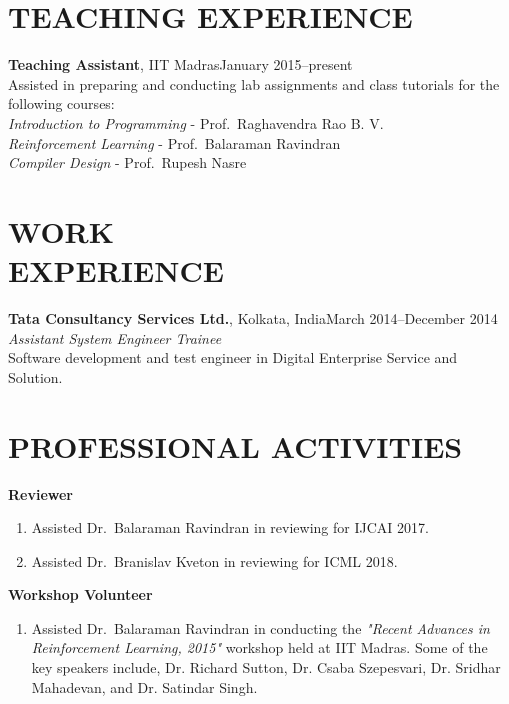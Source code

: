 \documentclass[margin,11pt]{res}
\begin{document}
\begin{resume}
\section{TEACHING EXPERIENCE}
\par
\textbf{Teaching Assistant}, IIT Madras\hfill January 2015--present\\
Assisted in preparing and conducting lab assignments and class tutorials for the following courses:\\
\textit{Introduction to Programming} - Prof.~Raghavendra Rao B. V. \\
\textit{Reinforcement Learning} - Prof.~Balaraman Ravindran\\
\textit{Compiler Design} - Prof.~Rupesh Nasre

\section{WORK\\EXPERIENCE}
\textbf{Tata Consultancy Services Ltd.}, Kolkata, India\hfill March 2014--December 2014\\
\textit{Assistant System Engineer Trainee}\\
Software development and test engineer in Digital Enterprise Service and Solution.


\section{PROFESSIONAL ACTIVITIES}
\textbf{Reviewer} 
\begin{enumerate}
\item Assisted Dr.~Balaraman Ravindran in reviewing for IJCAI 2017.
\item Assisted Dr.~Branislav Kveton in reviewing for ICML 2018.
\end{enumerate}

\textbf{Workshop Volunteer} 
\begin{enumerate}
\item Assisted Dr.~Balaraman Ravindran in conducting the \textit{"Recent Advances in Reinforcement Learning, 2015"} workshop held at IIT Madras. Some of the key speakers include, Dr. Richard Sutton, Dr. Csaba Szepesvari, Dr. Sridhar Mahadevan, and Dr. Satindar Singh.
\end{enumerate}



\end{resume}
\end{document}
